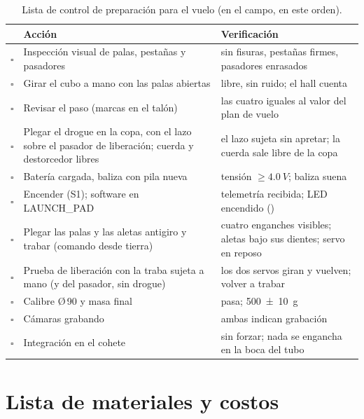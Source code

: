 \begin{table}[H]
\centering\small
\caption{Lista de control de preparación para el vuelo (en el campo, en este orden).}
\label{tab:fabricacion-check-vuelo}
\begin{tabularx}{\textwidth}{@{}cYY@{}}
\toprule
& \textbf{Acción} & \textbf{Verificación}\\\midrule
$\square$ & Inspección visual de palas, pestañas y pasadores & sin fisuras, pestañas firmes, pasadores enrasados\\
$\square$ & Girar el cubo a mano con las palas abiertas & libre, sin ruido; el hall cuenta\\
$\square$ & Revisar el paso (marcas en el talón) & las cuatro iguales al valor del plan de vuelo\\
$\square$ & Plegar el drogue en la copa, con el lazo sobre el pasador de liberación; cuerda y destorcedor libres & el lazo sujeta sin apretar; la cuerda sale libre de la copa\\
$\square$ & Batería cargada, baliza con pila nueva & tensión $\ge\SI{4.0}{V}$; baliza suena\\
$\square$ & Encender (S1); software en LAUNCH\_PAD & telemetría recibida; LED encendido ()\\
$\square$ & Plegar las palas y las aletas antigiro y trabar (comando desde tierra) & cuatro enganches visibles; aletas bajo sus dientes; servo en reposo\\
$\square$ & Prueba de liberación con la traba sujeta a mano (y del pasador, sin drogue) & los dos servos giran y vuelven; volver a trabar\\
$\square$ & Calibre Ø\,90 y masa final & pasa; \SI{500 \pm 10}{g}\\
$\square$ & Cámaras grabando & ambas indican grabación\\
$\square$ & Integración en el cohete & sin forzar; nada se engancha en la boca del tubo\\
\bottomrule
\end{tabularx}
\end{table}

\section{Lista de materiales y costos}\label{sec:fabricacion-costos}


